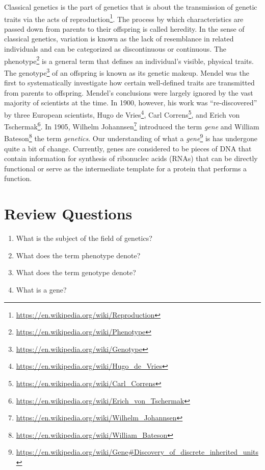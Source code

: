 \documentclass[]{book}
\providecommand{\tightlist}{%
  \setlength{\itemsep}{0pt}\setlength{\parskip}{0pt}}
\let\rmarkdownfootnote\footnote%
\def\footnote{\protect\rmarkdownfootnote}
\renewcommand{\href}[2]{#2\footnote{\url{#1}}}
\begin{document}
Classical genetics is the part of genetics that is about the
transmission of genetic traits via the acts of
\href{https://en.wikipedia.org/wiki/Reproduction}{reproduction}. The
process by which characteristics are passed down from parents to their
offspring is called heredity. In the sense of classical genetics,
variation is known as the lack of resemblance in related individuals and
can be categorized as discontinuous or continuous. The
\href{https://en.wikipedia.org/wiki/Phenotype}{phenotype} is a general
term that defines an individual's visible, physical traits. The
\href{https://en.wikipedia.org/wiki/Genotype}{genotype} of an offspring
is known as its genetic makeup. Mendel was the first to systematically
investigate how certain well-defined traits are transmitted from parents
to offspring. Mendel's conclusions were largely ignored by the vast
majority of scientists at the time. In 1900, however, his work was
``re-discovered'' by three European scientists,
\href{https://en.wikipedia.org/wiki/Hugo_de_Vries}{Hugo de Vries},
\href{https://en.wikipedia.org/wiki/Carl_Correns}{Carl Correns}, and
\href{https://en.wikipedia.org/wiki/Erich_von_Tschermak}{Erich von
Tschermak}. In 1905,
\href{https://en.wikipedia.org/wiki/Wilhelm_Johannsen}{Wilhelm
Johannsen} introduced the term \emph{gene} and
\href{https://en.wikipedia.org/wiki/William_Bateson}{William Bateson}
the term \emph{genetics}. Our understanding of what a
\href{https://en.wikipedia.org/wiki/Gene\#Discovery_of_discrete_inherited_units}{\emph{gene}}
is has undergone quite a bit of change. Currently, genes are considered
to be pieces of DNA that contain information for synthesis of ribonuclec
acids (RNAs) that can be directly functional or serve as the
intermediate template for a protein that performs a function.

\section{Review Questions}\label{review-questions}

\begin{enumerate}
\def\labelenumi{\arabic{enumi}.}
\tightlist
\item
  What is the subject of the field of genetics?
\item
  What does the term phenotype denote?
\item
  What does the term genotype denote?
\item
  What is a gene?
\end{enumerate}
\end{document}

